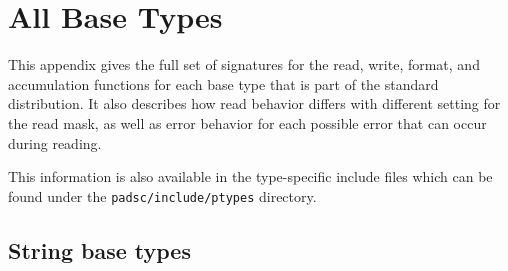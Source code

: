 \chapter{All \PADSL{} Base Types}
\label{ap:base-types}

This appendix gives the full set of signatures for the read, write,
format, and accumulation functions for each base type that is part
of the standard \pads{} distribution.  It also describes how
read behavior differs with different setting for the read mask,
as well as error behavior for each possible error that can
occur during reading.

This information is also available in the type-specific 
include files which can be found under the
{\tt padsc/include/ptypes} directory.

\section{String base types}


